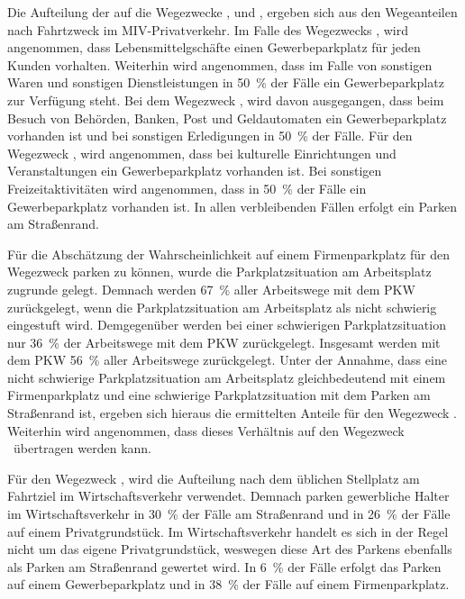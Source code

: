 Die Aufteilung der \UCs auf die Wegezwecke \Einkaufdot, \Erledigung und \Freizeitdot, ergeben sich aus den Wegeanteilen nach Fahrtzweck im \gls{MIV}-Privatverkehr. \cite{Rikus2015}
Im Falle des Wegezwecks \Einkaufdot, wird angenommen, dass Lebensmittelgschäfte einen Gewerbeparkplatz für jeden Kunden vorhalten.
Weiterhin wird angenommen, dass im Falle von sonstigen Waren und sonstigen Dienstleistungen in \SI{50}{\percent} der Fälle ein Gewerbeparkplatz zur Verfügung steht.
Bei dem Wegezweck \Erledigungdot, wird davon ausgegangen, dass beim Besuch von Behörden, Banken, Post und Geldautomaten ein Gewerbeparkplatz vorhanden ist und bei sonstigen Erledigungen in \SI{50}{\percent} der Fälle.
Für den Wegezweck \Freizeitdot, wird angenommen, dass bei kulturelle Einrichtungen und Veranstaltungen ein Gewerbeparkplatz vorhanden ist.
Bei sonstigen Freizeitaktivitäten wird angenommen, dass in \SI{50}{\percent} der Fälle ein Gewerbeparkplatz vorhanden ist.
In allen verbleibenden Fällen erfolgt ein Parken am Straßenrand.\medskip

Für die Abschätzung der Wahrscheinlichkeit auf einem Firmenparkplatz für den Wegezweck \Arbeit parken zu können, wurde die Parkplatzsituation am Arbeitsplatz zugrunde gelegt.
Demnach werden \SI{67}{\percent} aller Arbeitswege mit dem \gls{PKW} zurückgelegt, wenn die Parkplatzsituation am Arbeitsplatz als nicht schwierig eingestuft wird.
Demgegenüber werden bei einer schwierigen Parkplatzsituation nur \SI{36}{\percent} der Arbeitswege mit dem \gls{PKW} zurückgelegt.
Insgesamt werden mit dem \gls{PKW} \SI{56}{\percent} aller Arbeitswege zurückgelegt. \cite{Ecke2020}
Unter der Annahme, dass eine nicht schwierige Parkplatzsituation am Arbeitsplatz gleichbedeutend mit einem Firmenparkplatz und eine schwierige Parkplatzsituation mit dem Parken am Straßenrand ist, ergeben sich hieraus die ermittelten Anteile für den Wegezweck \Arbeitdot.
Weiterhin wird angenommen, dass dieses Verhältnis auf den Wegezweck \Ausbildung~übertragen werden kann.\medskip

Für den Wegezweck \dienstdot, wird die Aufteilung nach dem üblichen Stellplatz am Fahrtziel im Wirtschaftsverkehr verwendet. \cite{Rikus2015}
Demnach parken gewerbliche Halter im Wirtschaftsverkehr in \SI{30}{\percent} der Fälle am Straßenrand und in \SI{26}{\percent} der Fälle auf einem Privatgrundstück.
Im Wirtschaftsverkehr handelt es sich in der Regel nicht um das eigene Privatgrundstück, weswegen diese Art des Parkens ebenfalls als Parken am Straßenrand gewertet wird.
In \SI{6}{\percent} der Fälle erfolgt das Parken auf einem Gewerbeparkplatz und in \SI{38}{\percent} der Fälle auf einem Firmenparkplatz.\medskip

